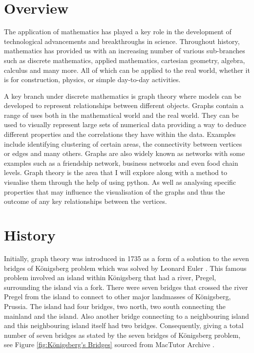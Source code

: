 \section{Overview}
The application of mathematics has played a key role in the development of technological advancements and breakthroughs in science. Throughout history, mathematics has provided us with an increasing number of various sub-branches such as discrete mathematics, applied mathematics, cartesian geometry, algebra, calculus and many more. All of which can be applied to the real world, whether it is for construction, physics, or simple day-to-day activities. 

A key branch under discrete mathematics is graph theory where models can be developed to represent relationships between different objects. Graphs contain a range of uses both in the mathematical world and the real world. They can be used to visually represent large sets of numerical data providing a way to deduce different properties and the correlations they have within the data. Examples include identifying clustering of certain areas, the connectivity between vertices or edges and many others. Graphs are also widely known as networks with some examples such as a friendship network, business networks and even food chain levels. Graph theory is the area that I will explore along with a method to visualise them through the help of using python. As well as analysing specific properties that may influence the visualisation of the graphs and thus the outcome of any key relationships between the vertices.

\section{History}
Initially, graph theory was introduced in 1735 as a form of a solution to the seven bridges of Königsberg problem which was solved by Leonard Euler \cite{POWELL20151}. This famous problem involved an island within Königsberg that had a river, Pregel, surrounding the island via a fork. There were seven bridges that crossed the river Pregel from the island to connect to other major landmasses of Königsberg, Prussia. The island had four bridges, two north, two south connecting the mainland and the island. Also another bridge connecting to a neighbouring island and this neighbouring island itself had two bridges. Consequently, giving a total number of seven bridges as stated by the seven bridges of Königsberg problem, see Figure \ref{fig:Königsberg's Bridges} sourced from MacTutor Archive \cite{MacTutor}. 

